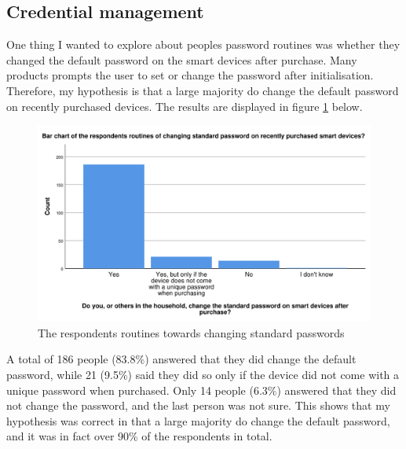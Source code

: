 \subsection{Credential management}
One thing I wanted to explore about peoples password routines was whether they changed the default password on the smart devices after purchase. Many products prompts the user to set or change the password after initialisation. Therefore, my hypothesis is that a large majority do change the default password on recently purchased devices. The results are displayed in figure \ref{fig:standard_password} below. 
\begin{figure}[!h]
    \centering
    \includegraphics[scale=0.55]{figures/diagrams/standard_password.pdf}
    \caption{The respondents routines towards changing standard passwords}
    \label{fig:standard_password}
\end{figure}
A total of 186 people (83.8\%) answered that they did change the default password, while 21 (9.5\%) said they did so only if the device did not come with a unique password when purchased. Only 14 people (6.3\%) answered that they did not change the password, and the last person was not sure. This shows that my hypothesis was correct in that a large majority do change the default password, and it was in fact over 90\% of the respondents in total. 

